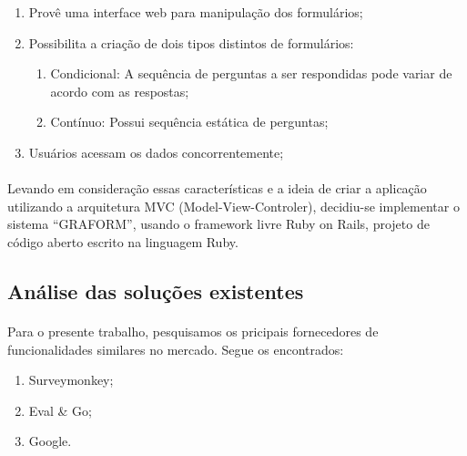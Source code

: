 \documentclass[11pt]{article}
\begin{document}
      \begin{enumerate}
        \item Provê uma interface web para manipulação dos formulários;
        \item Possibilita a criação de dois tipos distintos de formulários:
          \begin{enumerate}
            \item Condicional: A sequência de perguntas a ser respondidas pode variar de acordo com as respostas;
            \item Contínuo: Possui sequência estática de perguntas;
          \end{enumerate}
        \item Usuários acessam os dados concorrentemente;
      \end{enumerate}

      \paragraph{} \hspace{10pt}

      Levando em consideração essas características e a ideia de criar a aplicação utilizando a arquitetura MVC (Model-View-Controler), decidiu-se implementar o sistema “GRAFORM”, usando o framework livre Ruby on Rails, projeto  de código aberto escrito na linguagem Ruby.

      \subsection{Análise das soluções existentes}

      \paragraph{} \hspace{10pt}

      Para o presente trabalho, pesquisamos os pricipais fornecedores de funcionalidades similares no mercado. Segue os encontrados:

      \begin{enumerate}
        \item Surveymonkey;
        \item Eval \& Go;
        \item Google.
      \end{enumerate}

      \paragraph{} \hspace{10pt}
      
\end{document}

